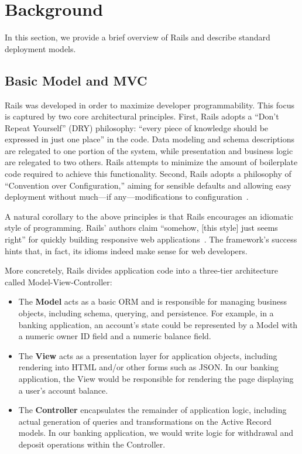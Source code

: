 
\section{Background}
\label{sec:motivation}

In this section, we provide a brief overview of Rails and describe standard deployment models.

\subsection{Basic Model and MVC}

Rails was developed in order to maximize developer programmability. This focus is captured by two core architectural principles. First, Rails adopts a ``Don't Repeat Yourself'' (DRY) philosophy: ``every piece of knowledge should be expressed in just one place'' in the code. Data modeling and schema descriptions are relegated to one portion of the system, while presentation and business logic are relegated to two others. Rails attempts to minimize the amount of boilerplate code required to achieve this functionality. Second, Rails adopts a philosophy of ``Convention over Configuration,'' aiming for sensible defaults and allowing easy deployment without much---if any---modifications to configuration~\cite{rails-book}.

A natural corollary to the above principles is that Rails encourages an idiomatic style of programming. Rails' authors claim ``somehow, [this style] just seems right'' for quickly building responsive web applications~\cite{rails-book}. The framework's success hints that, in fact, its idioms indeed make sense for web developers.

More concretely, Rails divides application code into a three-tier architecture called Model-View-Controller:

\begin{itemize}
\item The \textbf{Model} acts as a basic ORM and is responsible for managing business objects, including schema, querying, and persistence. For example, in a banking application, an account's state could be represented by a Model with a numeric owner ID field and a numeric balance field.

\item The \textbf{View} acts as a presentation layer for application objects, including rendering into HTML and/or other forms such as JSON. In our banking application, the View would be responsible for rendering the page displaying a user's account balance.

\item The \textbf{Controller} encapsulates the remainder of application logic, including actual generation of queries and transformations on the Active Record models. In our banking application, we would write logic for withdrawal and deposit operations within the Controller.
\end{itemize}

